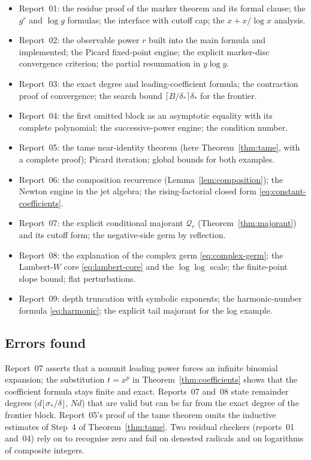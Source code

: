 \begin{itemize}[leftmargin=1.6em]
\item Report~01: the residue proof of the marker theorem and its formal clause; the $g^r$ and $\log g$ formulas; the  interface with cutoff cap; the $x+x/\log x$ analysis.
\item Report~02: the observable power $r$ built into the main formula and implemented; the Picard fixed-point engine; the explicit marker-disc convergence criterion; the partial resummation in $y\log y$.
\item Report~03: the exact degree and leading-coefficient formula; the contraction proof of convergence; the search bound $\lceil B/\delta_*\rceil\delta_*$ for the frontier.
\item Report~04: the first omitted block as an asymptotic equality with its complete polynomial; the successive-power engine; the condition number.
\item Report~05: the tame near-identity theorem (here Theorem~\ref{thm:tame}, with a complete proof); Picard iteration; global bounds for both examples.
\item Report~06: the composition recurrence (Lemma~\ref{lem:composition}); the Newton engine in the jet algebra; the rising-factorial closed form \eqref{eq:constant-coefficients}.
\item Report~07: the explicit conditional majorant $\mathcal Q_r$ (Theorem~\ref{thm:majorant}) and its cutoff form; the negative-side germ by reflection.
\item Report~08: the explanation of the complex germ \eqref{eq:complex-germ}; the Lambert-$W$ core \eqref{eq:lambert-core} and the $\log\log$ scale; the finite-point slope bound; flat perturbations.
\item Report~09: depth truncation with symbolic exponents; the harmonic-number formula \eqref{eq:harmonic}; the explicit tail majorant for the log example.
\end{itemize}

\subsection{Errors found}

Report~07 asserts that a nonunit leading power forces an infinite binomial expansion; the substitution $t=x^p$ in Theorem~\ref{thm:coefficients} shows that the coefficient formula stays finite and exact. Reports~07 and~08 state remainder degrees ($d\lfloor\sigma_*/\delta\rfloor$, $Nd$) that are valid but can be far from the exact degree of the frontier block. Report~05's proof of the tame theorem omits the inductive estimates of Step~4 of Theorem~\ref{thm:tame}. Two residual checkers (reports~01 and~04) rely on  to recognise zero and fail on denested radicals and on logarithms of composite integers.

